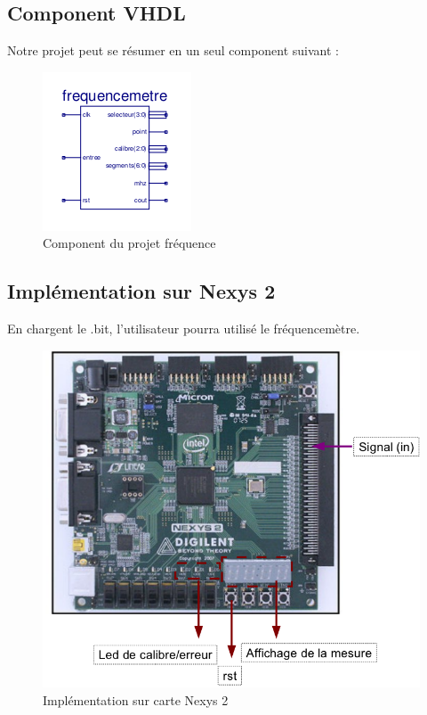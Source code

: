 \documentclass[a4paper,11pt]{article}
\begin{document}
\subsection{Component VHDL}
Notre projet peut se résumer en un seul component suivant :
\begin{figure}[H]
\begin{center}
	\includegraphics[scale=1]{freqa0.png}
	\caption{Component du projet fréquence}
\end{center}
\end{figure}

\subsection{Implémentation sur Nexys 2}
En chargent le .bit, l'utilisateur pourra utilisé le fréquencemètre.
\begin{figure}[H]
\begin{center}
	\includegraphics[scale=.5]{fpga.png}
	\caption{Implémentation sur carte Nexys 2}
\end{center}
\end{figure}
\end{document}
